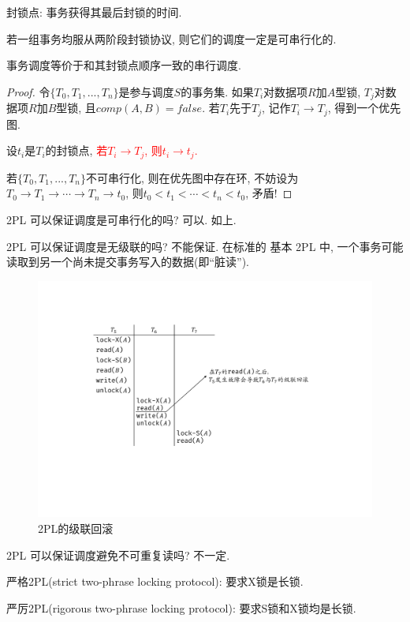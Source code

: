 \begin{definition}[封锁点]
  封锁点: 事务获得其最后封锁的时间.
\end{definition}

\begin{theorem}
  若一组事务均服从两阶段封锁协议, 则它们的调度一定是可串行化的.

  事务调度等价于和其封锁点顺序一致的串行调度.
\end{theorem}

\begin{proof}
  令$\{T_0,T_1,...,T_n\}$是参与调度$S$的事务集. 如果$T_i$对数据项$R$加$A$型锁, $T_j$对数据项$R$加$B$型锁, 且$comp(A,B)=false$. 若$T_i$先于$T_j$, 记作$T_i\to T_j$, 得到一个优先图.

  设$t_i$是$T_i$的封锁点, \textcolor{red}{若$T_i\to T_j$, 则$t_i\to t_j$.}

  若$\{T_0,T_1,...,T_n\}$不可串行化, 则在优先图中存在环, 不妨设为$T_0\to T_1\to \cdots \to T_n \to t_0$, 则$t_0<t_1<\cdots<t_n<t_0$, 矛盾!
\end{proof}

2PL 可以保证调度是可串行化的吗? 可以. 如上.

2PL 可以保证调度是无级联的吗? 不能保证. 在标准的 基本 2PL 中, 一个事务可能读取到另一个尚未提交事务写入的数据(即“脏读”).

\begin{figure}[H]
    \centering
    \includegraphics[width=.7\textwidth]{figure/级联.pdf}
    \caption{2PL的级联回滚}
\end{figure}

2PL 可以保证调度避免不可重复读吗? 不一定. 

严格2PL(strict two-phrase locking protocol): 要求X锁是长锁.

严厉2PL(rigorous two-phrase locking protocol): 要求S锁和X锁均是长锁.




